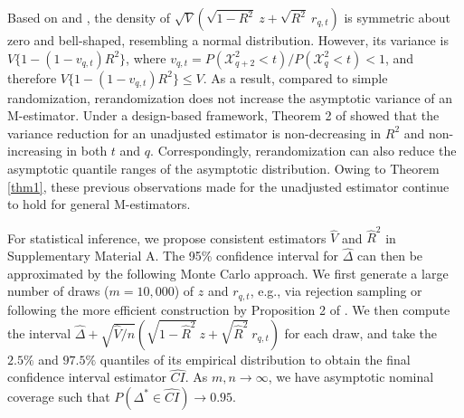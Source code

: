 \documentclass[12pt]{article}
\begin{document}
Based on \cite{morgan2012rerandomization} and \citet{li2018asymptotic}, the density of $\sqrt{V}\left(\sqrt{1-R^2}\ z + \sqrt{R^2}\ r_{q,t}\right)$ is symmetric about zero and bell-shaped, resembling a normal distribution. However, its variance is $V\{1- (1-v_{q,t})R^2\}$, where $v_{q,t} = P(\mathcal{X}^2_{q+2} < t)/P(\mathcal{X}^2_{q} < t) < 1$, and therefore $V\{1- (1-v_{q,t})R^2\} \le V$. As a result, compared to simple randomization, rerandomization does not increase the asymptotic variance of an M-estimator. Under a design-based framework, Theorem 2 of \cite{li2018asymptotic} %
showed that the variance reduction for an unadjusted estimator is non-decreasing in $R^2$ and non-increasing in both $t$ and $q$. {Correspondingly, rerandomization can also reduce the asymptotic quantile ranges of the asymptotic distribution.} Owing to Theorem \ref{thm1}, these previous observations made for the unadjusted estimator continue to hold for general M-estimators. 

For statistical inference, we propose consistent estimators $\widehat{V}$ and $\widehat{R}^2$ in Supplementary Material A. The 95\% confidence interval for $\widehat{\Delta}$ can then be approximated by the following Monte Carlo approach. We first generate a large number of draws ($m=10,000$) of $z$ and $r_{q,t}$, e.g., via rejection sampling {or following the more efficient construction by Proposition 2 of \cite{li2018asymptotic}}. We then compute the interval $\widehat{\Delta}+\sqrt{\widehat{V}/n} \left(\sqrt{1-\widehat{R}^2}\ z + \sqrt{\widehat{R}^2}\ r_{q,t}\right)$ for each draw, and take the $2.5\%$ and $97.5\%$ quantiles of its empirical distribution to obtain the final confidence interval estimator $\widehat{CI}$. As $m,n\rightarrow \infty$, we have asymptotic nominal coverage such that $P(\Delta^*\in \widehat{CI}) \rightarrow 0.95$.
\end{document}
